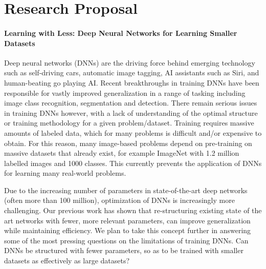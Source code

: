 \documentclass[]{article}
\begin{document}
\section{Research Proposal}
\paragraph{Learning with Less: Deep Neural Networks for Learning Smaller Datasets}
Deep neural networks (DNNs) are the driving force behind emerging technology such as self-driving cars, automatic image tagging, AI assistants such as Siri, and human-beating go playing AI. Recent breakthroughs in training DNNs have been responsible for vastly improved generalization in a range of tasking including image class recognition, segmentation and detection. There remain serious issues in training DNNs however, with a lack of understanding of the optimal structure or training methodology for a given problem/dataset. Training requires massive amounts of labeled data, which for many problems is difficult and/or expensive to obtain. For this reason, many image-based problems depend on pre-training on massive datasets that already exist, for example ImageNet with 1.2 million labelled images and 1000 classes. This currently prevents the application of DNNs for learning many real-world problems.

Due to the increasing number of parameters in state-of-the-art deep networks (often more than 100 million), optimization of DNNs is increasingly more challenging. Our previous work has shown that re-structuring existing state of the art networks with fewer, more relevant parameters, can improve generalization while maintaining efficiency. We plan to take this concept further in answering some of the most pressing questions on the limitations of training DNNs. Can DNNs be structured with fewer parameters, so as to be trained with smaller datasets as effectively as large datasets? 
\end{document}
